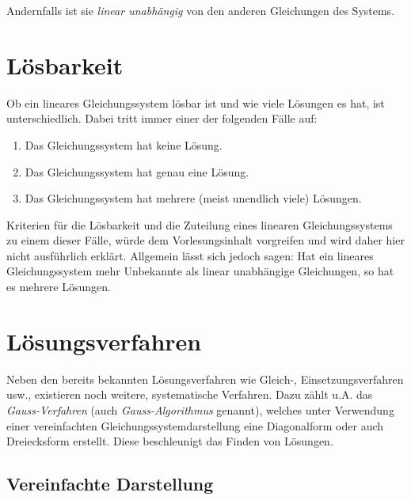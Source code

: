 		Andernfalls ist sie \emph{linear unabh\"angig} von den anderen Gleichungen des Systems.
		
	\section{L\"osbarkeit}
	
		Ob ein lineares Gleichungssystem l\"osbar ist und wie viele L\"osungen es hat, ist unterschiedlich.
		Dabei tritt immer einer der folgenden F\"alle auf:
		
		\begin{enumerate}
			\item Das Gleichungssystem hat keine L\"osung.
			\item Das Gleichungssystem hat genau eine L\"osung.
			\item Das Gleichungssystem hat mehrere (meist unendlich viele) L\"osungen.
		\end{enumerate}
		
		\noindent Kriterien f\"ur die L\"osbarkeit und die Zuteilung eines linearen Gleichungssystems zu einem dieser F\"alle,
		w\"urde dem Vorlesungsinhalt vorgreifen und wird daher hier nicht ausf\"uhrlich erkl\"art.
		Allgemein l\"asst sich jedoch sagen:
		Hat ein lineares Gleichungssystem mehr Unbekannte als linear unabh\"angige Gleichungen,
		so hat es mehrere L\"osungen.
		
	\section{L\"osungsverfahren}
	
		Neben den bereits bekannten L\"osungsverfahren wie Gleich-, Einsetzungsverfahren usw., existieren noch weitere, systematische Verfahren.
		Dazu z\"ahlt u.A. das \emph{Gauss-Verfahren} (auch \emph{Gauss-Algorithmus} genannt),
		welches unter Verwendung einer vereinfachten Gleichungssystemdarstellung eine Diagonalform oder auch Dreiecksform erstellt.
		Diese beschleunigt das Finden von L\"osungen.
		
		\subsection{Vereinfachte Darstellung}
		
